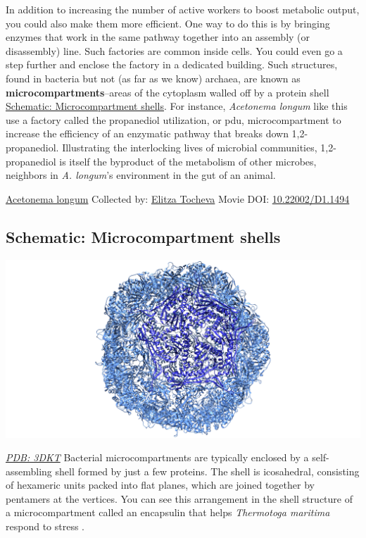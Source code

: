 \documentclass[]{tufte-book}
\begin{document}
In addition to increasing the number of active workers to boost metabolic output, you could also make them more efficient. One way to do this is by bringing enzymes that work in the same pathway together into an assembly (or disassembly) line. Such factories are common inside cells. You could even go a step further and enclose the factory in a dedicated building. Such structures, found in bacteria but not (as far as we know) archaea, are known as \textbf{microcompartments}--areas of the cytoplasm walled off by a protein shell \protect\hyperlink{Microcompartment_shells}{Schematic: Microcompartment shells}. For instance, \emph{Acetonema longum} like this use a factory called the propanediol utilization, or pdu, microcompartment to increase the efficiency of an enzymatic pathway that breaks down 1,2-propanediol. Illustrating the interlocking lives of microbial communities, 1,2-propanediol is itself the byproduct of the metabolism of other microbes, neighbors in \emph{A. longum}'s environment in the gut of an animal.



\hypertarget{htmlwidget-d61f7e18613dc2571151}{}

\label{fig:4-6}\protect\hyperlink{tree}{Acetonema longum} Collected by: \protect\hyperlink{elitza_tocheva}{Elitza Tocheva} Movie DOI: \href{https://doi.org/10.22002/D1.1494}{10.22002/D1.1494}

\hypertarget{Microcompartment_shells}{%
\subsection*{Schematic: Microcompartment shells}\label{Microcompartment_shells}}

\includegraphics{img/schematics/4_6_1}

\href{http://rcsb.org/structure/3DKT}{\emph{PDB: 3DKT}}
Bacterial microcompartments are typically enclosed by a self-assembling shell formed by just a few proteins. The shell is icosahedral, consisting of hexameric units packed into flat planes, which are joined together by pentamers at the vertices. You can see this arrangement in the shell structure of a microcompartment called an encapsulin that helps \emph{Thermotoga maritima} respond to stress \citep{sutter2008}.
\end{document}
